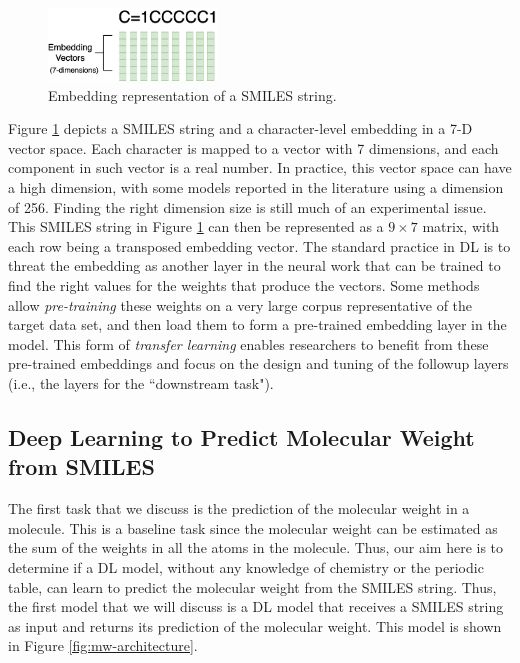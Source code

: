   \begin{figure}[htbp]
        \centering
        \includegraphics[width=0.4\textwidth]{figures/smileembedding.png}
        \caption{Embedding representation of a SMILES string.}
        \label{fig:smiles-to-embed}
    \end{figure}
Figure \ref{fig:smiles-to-embed} depicts a SMILES string and a  character-level embedding in a 7-D vector space. Each character is mapped to a vector with 7 dimensions, and each component in such vector is a real number.  In practice, this vector space can have a high dimension, with some models reported in the literature using a dimension of 256. Finding the right dimension size is still much of an experimental issue. This SMILES  string in 
Figure \ref{fig:smiles-to-embed} can then be represented as  a $9 \times 7$ matrix, with each row being a transposed embedding vector.
The standard practice in DL is to threat the embedding as  another layer in the neural work that can be trained to find the right values for the weights that produce the vectors. Some methods allow {\em pre-training} these weights on a very large corpus representative of the target data set, and then load them to form  a pre-trained embedding layer in the model. This form of {\em transfer learning} enables researchers to benefit from these pre-trained embeddings  and 
 focus on the design and tuning of the followup layers (i.e., the layers for the ``downstream task").

    \subsection{Deep Learning to Predict Molecular Weight from SMILES}
    The first task that we discuss is the prediction of the molecular weight in a molecule. This is a baseline task since the molecular weight can be estimated as the sum of the weights in all the atoms in the molecule. Thus, our aim here is to determine if  a DL model, without any knowledge of chemistry or the periodic table, can learn to predict the molecular weight from the SMILES string. Thus, the first model that we will discuss is a DL model that receives a SMILES string as input and returns its prediction of the molecular weight. This model is shown in Figure \ref{fig:mw-architecture}.
    
